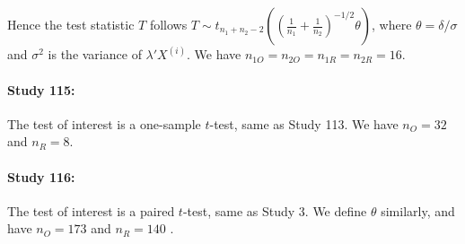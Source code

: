 \documentclass[11pt]{article}
\theoremstyle{definition}
\theoremstyle{custom}
\begin{document}
  Hence the test statistic $T$ follows $T \sim t_{n_1 + n_2 - 2}\left(\left(\frac{1}{n_1} + \frac{1}{n_2}\right)^{-1/2} \theta\right)$, where $\theta = \delta / \sigma$ and $\sigma^2$ is the variance of $\lambda' X^{(i)}$. We have $n_{1O} = n_{2O} = n_{1R} = n_{2R} = 16$.

  \paragraph{Study 115: \citet{Nurmsoo:2008jq}}
  The test of interest is a one-sample $t$-test, same as Study 113. We have $n_O = 32$ and $n_R = 8$.

  \paragraph{Study 116: \citet{Vul:2008cz}}
  The test of interest is a paired $t$-test, same as Study 3. We define $\theta$ similarly, and have $n_O = 173$ and $n_R = 140$ \citep{Steegen:2014ii}.
\end{document}

